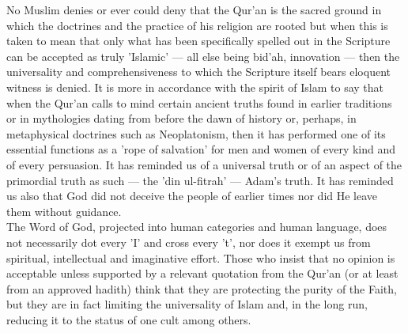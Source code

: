 \documentclass[10pt, twoside,openright]{book}
\begin{document}
No Muslim denies or ever could deny that the Qur'an is the sacred ground in which the doctrines and 
the practice of his religion are rooted but when this is taken to mean that only what has been 
specifically spelled out in the Scripture can be accepted as truly 'Islamic' --- all else being bid'ah, 
innovation --- then the universality and comprehensiveness to which the Scripture itself bears eloquent 
witness is denied. It is more in accordance with the spirit of Islam to say that when the Qur'an 
calls to mind certain ancient truths found in earlier traditions or in mythologies dating from before 
the dawn of history or, perhaps, in metaphysical doctrines such as Neoplatonism, then it has 
performed one of its essential functions as a 'rope of salvation' for men and women of every kind and 
of every persuasion. It has reminded us of a universal truth or of an aspect of the primordial truth 
as such --- the 'din ul-fitrah' --- Adam's truth. It has reminded us also that God did not deceive the 
people of earlier times nor did He leave them without guidance. \\

The Word of God, projected into human categories and human language, does not necessarily dot every 
'I' and cross every 't', nor does it exempt us from spiritual, intellectual and imaginative effort. 
Those who insist that no opinion is acceptable unless supported by a relevant quotation from the 
Qur'an (or at least from an approved hadith) think that they are protecting the purity of the Faith, 
but they are in fact limiting the universality of Islam and, in the long run, reducing it to the 
status of one cult among others. \\
\end{document}
